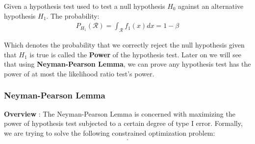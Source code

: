 \begin{definition}
    Given a hypothesis test used to test a null hypothesis $H_0$ against an alternative hypothesis $H_1$. The probability:
    \begin{align*}
        P_{H_1}(\mathcal{R}) = \int_{\mathcal{R}} f_1(x)dx = 1 - \beta
    \end{align*}

    \noindent Which denotes the probability that we correctly reject the null hypothesis given that $H_1$ is true  is called the \textbf{Power} of the hypothesis test. Later on we will see that using \textbf{Neyman-Pearson Lemma}, we can prove any hypothesis test has the power of at most the likelihood ratio test's power. 
\end{definition}


\subsubsection{Neyman-Pearson Lemma}
\textbf{Overview} : The Neyman-Pearson Lemma is concerned with maximizing the power of hypothesis test subjected to a certain degree of type I error. Formally, we are trying to solve the following constrained optimization problem:
\begin{align*}
    .
\end{align*}



